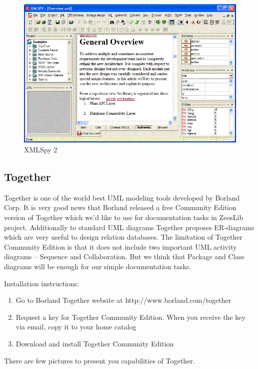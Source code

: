 \documentclass[a4paper,12pt,oneside]{book}
\begin{document}
\begin{figure}[htbp] 
  \centering
  \includegraphics[width=1.0\textwidth]{BTE/XmlSpy2.png}
  \caption{XMLSpy 2}
  \label{fig:XmlSpy2}
\end{figure}
				
\subsection{Together}

Together is one of the world best UML modeling tools developed by Borland Corp.
It is very good news that Borland released a free Community Edition version of Together which we’d like to use for documentation tasks in ZeosLib project.
Additionally to standard UML diagrams Together proposes ER-diagrams which are very useful to design relation databases.
The limitation of Together Community Edition is that it does not include two important UML activity diagrams – Sequence and Collaboration.
But we think that Package and Class diagrams will be enough for our simple documentation tasks.

Installation instructions:
\begin{enumerate}
  \item Go to Borland Together website at http://www.borland.com/together
	\item Request a key for Together Community Edition. When you receive the key via email, copy it to your home catalog
	\item Download and install Together Community Edition
\end{enumerate}

There are few pictures to present you capabilities of Together.
\end{document}
